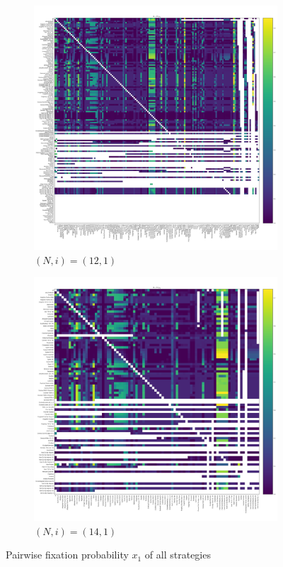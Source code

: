 \documentclass{article}
\begin{document}
\begin{figure}[!hbtp]
\begin{subfigure}[t]{.3\textwidth}
        \centering
        \includegraphics[width=.8\textwidth]{../img/fixation_heatmap_12_invade.pdf}
        \caption{\((N,i)=(12, 1)\)}
    \end{subfigure}%

    \begin{subfigure}[t]{.3\textwidth}
        \centering
        \includegraphics[width=.8\textwidth]{../img/fixation_heatmap_14_invade.pdf}
        \caption{\((N,i)=(14, 1)\)}
    \end{subfigure}%
    \caption{Pairwise fixation probability \(x_{1}\) of all strategies}
    \label{fig:fixation_heatmap_invade}
\end{figure}
\end{document}

